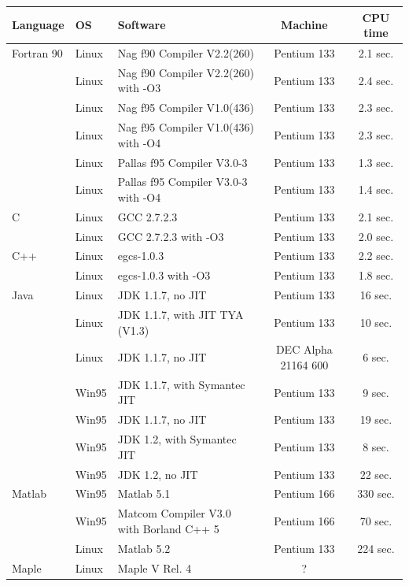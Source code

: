 \begin{table}[htbp]
  \begin{center}
    \leavevmode
    \begin{tabular}{llp{3cm}|c|c}
      Language & OS & Software & Machine & CPU time \\\hline\hline  
   Fortran 90 & Linux & Nag f90 Compiler V2.2(260) & Pentium 133 & 2.1 sec.\\
           & Linux & Nag f90 Compiler V2.2(260) with -O3 & Pentium 133 & 2.4 sec.\\
           & Linux & Nag f95 Compiler V1.0(436) & Pentium 133 & 2.3 sec.\\
           & Linux & Nag f95 Compiler V1.0(436) with -O4& Pentium 133 & 2.3 sec.\\
           & Linux & Pallas f95 Compiler V3.0-3 & Pentium 133 & 1.3 sec.\\
           & Linux & Pallas f95 Compiler V3.0-3 with -O4& Pentium 133 & 1.4 sec.\\\hline
   C       & Linux & GCC 2.7.2.3 & Pentium 133 & 2.1 sec. \\
           & Linux & GCC 2.7.2.3 with -O3 & Pentium 133 & 2.0 sec. \\\hline
   C++     & Linux & egcs-1.0.3 & Pentium 133 & 2.2 sec. \\
           & Linux & egcs-1.0.3 with -O3 & Pentium 133 & 1.8 sec. \\\hline
      Java & Linux & JDK 1.1.7, no JIT & Pentium 133 & 16 sec. \\
           & Linux & JDK 1.1.7, with JIT TYA (V1.3) & Pentium 133 & 10 sec.\\
           & Linux & JDK 1.1.7, no JIT & DEC Alpha 21164 600 & 6 sec. \\
           & Win95 & JDK 1.1.7, with Symantec JIT & Pentium 133 & 9 sec. \\
           & Win95 & JDK 1.1.7, no JIT & Pentium 133 & 19 sec. \\
           & Win95 & JDK 1.2, with Symantec JIT & Pentium 133 & 8 sec. \\
           & Win95 & JDK 1.2, no JIT & Pentium 133 & 22 sec. \\\hline
   Matlab  & Win95 & Matlab 5.1 & Pentium 166 & 330 sec.\\
           & Win95 & Matcom Compiler V3.0 with Borland C++ 5 & Pentium 166 & 70 sec.\\
           & Linux & Matlab 5.2 & Pentium 133 &  224 sec.\\\hline
   Maple   & Linux & Maple V Rel. 4 & ? & \\\hline

\end{tabular}
\end{center}
\end{table}
